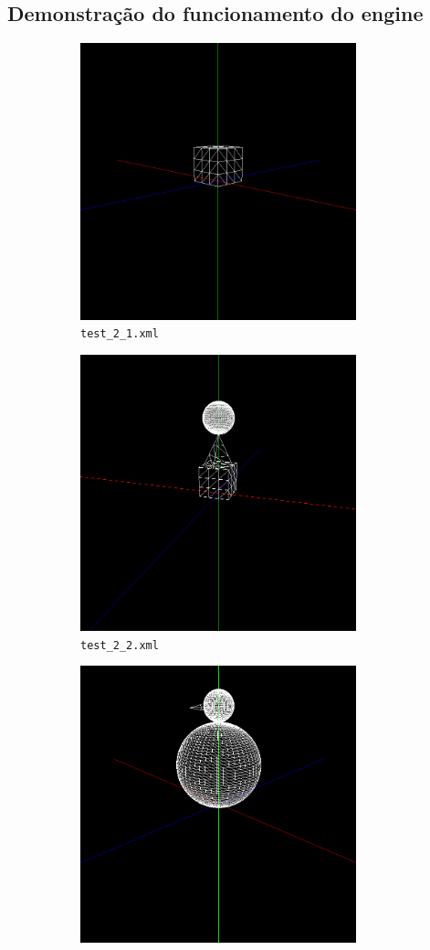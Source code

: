 \documentclass[11pt,a4paper]{report}
\begin{document}
\subsection{Demonstração do funcionamento do engine}

\vspace{1cm}
\begin{figure}[H]
\centering
\begin{subfigure}{0.5\textwidth}
  \centering
  \includegraphics[width = 8cm,height = 8cm]{box.png}
  \caption{\texttt{test\_2\_1.xml}}
  \label{fig:box}
\end{subfigure}%
\begin{subfigure}{0.5\textwidth}
  \centering
  \includegraphics[width = 8cm,height = 8cm]{construction.png}
  \caption{\texttt{test\_2\_2.xml}}
  \label{fig:construction}
\end{subfigure}
\begin{subfigure}{0.5\textwidth}
  \centering
  \includegraphics[width = 8cm,height = 8cm]{snowman.png}

\end{subfigure}
\end{figure}
\end{document}
